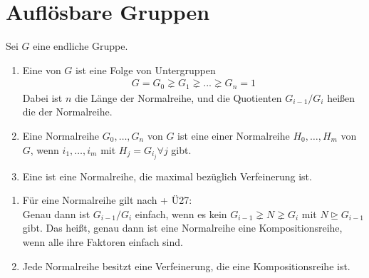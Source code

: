 \section{Auflösbare Gruppen}

Sei $G$ eine endliche Gruppe.

\begin{definition}
	\begin{enumerate}
		\item Eine  von $G$ ist eine Folge von Untergruppen
		\begin{align}
		G = G_0 \gneq G_1 \gneq ... \gneq G_n = 1
		\end{align}
		Dabei ist $n$ die Länge der Normalreihe, und die Quotienten $G_{i-1}/G_i$ heißen die  der Normalreihe.
		\item Eine Normalreihe $G_0, \dots, G_n$ von $G$ ist eine  einer Normalreihe $H_0,\dots,H_m$  von $G$, wenn $i_1,\dots,i_m$ mit $H_j = G_{i_{j}} \forall j$ gibt.
		\item Eine  ist eine Normalreihe, die maximal bezüglich Verfeinerung ist.
	\end{enumerate}
\end{definition}

\begin{remark}
	\begin{enumerate}
		\item Für eine Normalreihe  gilt nach  + Ü27:\\ %
		Genau dann ist $G_{i-1}/G_i$ einfach, wenn es kein $G_{i-1} \gneq N \gneq G_i$ mit $N \unrhd G_{i-1}$ gibt. Das heißt, genau dann ist eine Normalreihe eine Kompositionsreihe, wenn alle ihre Faktoren einfach sind. %
		\item Jede Normalreihe besitzt eine Verfeinerung, die eine Kompositionsreihe ist.
	\end{enumerate}
\end{remark}

